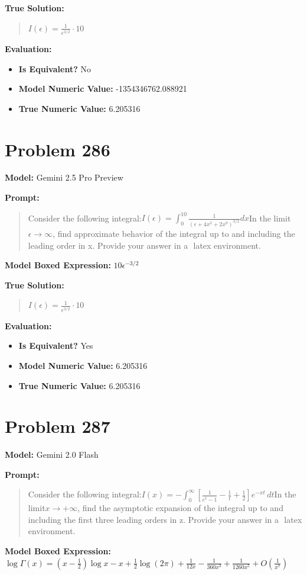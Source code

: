 \documentclass{article}
\begin{document}
{\textbf{True Solution:}
\begin{quote}
$I(\epsilon) = \frac{1}{\epsilon^{3/2}} \cdot 10$
\end{quote}

\textbf{Evaluation:}
\begin{itemize}
\item \textbf{Is Equivalent?} No
\item \textbf{Model Numeric Value:} -1354346762.088921
\item \textbf{True Numeric Value:} 6.205316
\end{itemize}
\vspace{1cm}
\section*{Problem 286}
\textbf{Model:} Gemini 2.5 Pro Preview

\textbf{Prompt:}
\begin{quote}
Consider the following integral:$I(\epsilon) = \int_0^{10} \frac{1}{(\epsilon + 4x^3 + 2x^9)^{3/2}} dx$In the limit$\epsilon \rightarrow \infty$, find approximate behavior of the integral up to and including the leading order in x. Provide your answer in a $\boxed{}$ latex environment.
\end{quote}
\textbf{Model Boxed Expression:} $10\epsilon^{-3/2}$

\textbf{True Solution:}
\begin{quote}
$I(\epsilon) = \frac{1}{\epsilon^{3/2}} \cdot 10$
\end{quote}

\textbf{Evaluation:}
\begin{itemize}
\item \textbf{Is Equivalent?} Yes
\item \textbf{Model Numeric Value:} 6.205316
\item \textbf{True Numeric Value:} 6.205316
\end{itemize}
\vspace{1cm}
\section*{Problem 287}
\textbf{Model:} Gemini 2.0 Flash

\textbf{Prompt:}
\begin{quote}
Consider the following integral:$I(x) = -\int_{0}^{\infty} \left[ \frac{1}{e^t - 1} - \frac{1}{t} + \frac{1}{2} \right] e^{-xt} \, dt$In the limit$x \to +\infty$, find the asymptotic expansion of the integral up to and including the first three leading orders in z. Provide your answer in a $\boxed{}$ latex environment.
\end{quote}
\textbf{Model Boxed Expression:} $\log \Gamma(x) = \left(x - \frac{1}{2}\right) \log x - x + \frac{1}{2} \log(2\pi) + \frac{1}{12x} - \frac{1}{360x^3} + \frac{1}{1260x^5} + O\left(\frac{1}{x^7}\right)$

}
\end{document}

